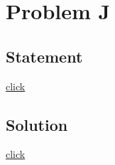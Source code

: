 \section{Problem J}
    \subsection{Statement}
        {\color{blue} \href{http://hsin.hr/coci/archive/2006_2007/contest4_tasks.pdf}{click}}

    \subsection{Solution}
        {\color{blue} \href{http://hsin.hr/coci/archive/2006_2007/contest4_solutions.zip}{click}}
